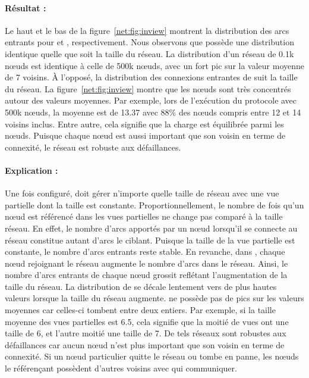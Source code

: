 \paragraph{Résultat :} Le haut et le bas de la figure~\ref{net:fig:inview}
montrent la distribution des arcs entrants pour \CYCLON et \SPRAY,
respectivement. Nous observons que \CYCLON possède une distribution identique
quelle que soit la taille du réseau. La distribution d'un réseau de 0.1k nœuds
est identique à celle de 500k nœuds, avec un fort pic sur la valeur moyenne de 7
voisins. À l'opposé, la distribution des connexions entrantes de \SPRAY suit la
taille du réseau. La figure~\ref{net:fig:inview} montre que les nœuds sont très
concentrés autour des valeurs moyennes. Par exemple, lors de l'exécution du
protocole \SPRAY avec 500k nœuds, la moyenne est de 13.37 avec 88\% des nœuds
compris entre 12 et 14 voisins inclus. Entre autre, cela signifie que la charge
est équilibrée parmi les nœuds. Puisque chaque nœud est aussi important que son
voisin en terme de connexité, le réseau est robuste aux défaillances.

\paragraph{Explication :} Une fois configuré, \CYCLON doit gérer n'importe
quelle taille de réseau avec une vue partielle dont la taille est
constante. Proportionnellement, le nombre de fois qu'un nœud est référencé dans
les vues partielles ne change pas comparé à la taille réseau. En effet, le
nombre d'arcs apportés par un nœud lorsqu'il se connecte au réseau constitue
autant d'arcs le ciblant. Puisque la taille de la vue partielle est constante,
le nombre d'arcs entrants reste stable. En revanche, dans \SPRAY, chaque nœud
rejoignant le réseau augmente le nombre d'arcs dans le réseau. Ainsi, le nombre
d'arcs entrants de chaque nœud grossit reflétant l'augmentation de la taille du
réseau. La distribution de \SPRAY se décale lentement vers de plus hautes
valeurs lorsque la taille du réseau augmente. \SPRAY ne possède pas de pics sur
les valeurs moyennes car celles-ci tombent entre deux entiers. Par exemple, si
la taille moyenne des vues partielles est 6.5, cela signifie que la moitié de
vues ont une taille de 6, et l'autre moitié une taille de 7. De tels réseaux
sont robustes aux défaillances car aucun nœud n'est plus important que son
voisin en terme de connexité. Si un nœud particulier quitte le réseau ou tombe
en panne, les nœuds le référençant possèdent d'autres voisins avec qui
communiquer.

